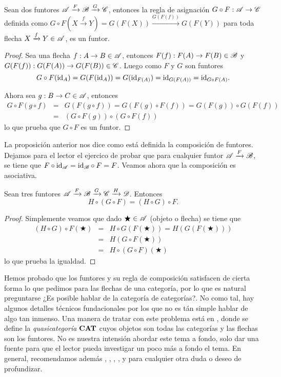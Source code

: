 \documentclass{comunicaciones}
\begin{document}
\begin{prop}
    Sean dos funtores $\mathscr A\xrightarrow{F}\mathscr B\xrightarrow{G}\mathscr C$, entonces la regla de asignación $G\circ F:\mathscr A\to\mathscr C$ definida como 
    $G\circ F(X\xrightarrow{f}Y)=G(F(X))\xrightarrow{G(F(f))}G(F(Y))$ para toda flecha $X\xrightarrow{f}Y\in\mathscr A$, es un funtor.
\end{prop}
\begin{proof}
    Sea una flecha $f:A\to B\in \mathscr A$, entonces $F(f):F(A)\to F(B)\in\mathscr B$ y $G(F(f)):G(F(A))\to G(F(B))\in\mathscr C$.
    Luego como $F$ y $G$ son funtores
    \begin{equation*}
    G\circ F(\mathrm{id}_A) =G(F(\mathrm{id}_A)) =G(\mathrm{id}_{F(A)}) =\mathrm{id}_{G(F(A))}=\mathrm{id}_{G\circ F(A)}.
    \end{equation*}

    Ahora sea $g:B\to C\in\mathscr A$, entonces
    \begin{eqnarray*}
    G\circ F(g\circ f) &=&G(F(g\circ f))=G(F(g)\circ F(f))=G(F(g))\circ G(F(f)) \\
    &=&(G\circ F(g))\circ(G\circ F(f))
    \end{eqnarray*}
    lo que prueba que $G\circ F$ es un funtor.
\end{proof}

La proposición anterior nos dice como está definida la composición de funtores. Dejamos para el lector el ejercico de probar que para cualquier funtor $\mathscr A\xrightarrow{F}\mathscr B$, se tiene que $F\circ\mathrm{id}_\mathscr A=\mathrm{id}_\mathscr B\circ F=F$.
Veamos ahora que la composición es asociativa.

\begin{prop}
    Sean tres funtores $\mathscr A\xrightarrow{F}\mathscr B\xrightarrow{G}\mathscr C\xrightarrow{H}\mathscr D$. Entonces $$H\circ(G\circ F)=(H\circ G)\circ F.$$
\end{prop}
\begin{proof}
    Simplemente veamos que dado $\bigstar\in\mathscr A$ (objeto o flecha) se tiene
    que
    \begin{eqnarray*}
    (H\circ G) \circ F(\bigstar)  &=&
    H\circ G(F(\bigstar) ) =H(G(F(\bigstar)))  \\
    &=&H(G\circ F(\bigstar))  \\
    &=&H\circ(G\circ F)(\bigstar) 
    \end{eqnarray*}
    lo que prueba la igualdad.
\end{proof}

Hemos probado que los funtores y su regla de composición satisfacen de cierta forma lo que pedimos para las flechas de una categoría, por lo que es natural preguntarse
¿Es posible hablar de la categoría de categorías?. No como tal, hay algunos detalles técnicos fundacionales por los que no es tán simple hablar de algo tan inmenso. Una manera de
tratar con este problema está en \cite{JoyCat}, donde se define la \emph{quasicategoría} $\mathbf{CAT}$ cuyos objetos son todas las categorías y las flechas son los funtores. 
No es nuestra intensión abordar este tema a fondo, solo dar una fuente para que el lector pueda investigar un poco más a fondo el tema. En general, recomendamos además
\cite{Handbook}, \cite{Wil2002}, \cite{Sau1970}, \cite{Catheory}, \cite{Catfound} y \cite{Leinster} para cualquier otra duda o deseo de profundizar.
\end{document}
